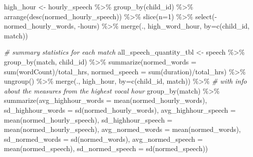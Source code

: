 \documentclass[
]{article}
\newenvironment{Shaded}{\begin{snugshade}}{\end{snugshade}}
\newcommand{\AttributeTok}[1]{\textcolor[rgb]{0.77,0.63,0.00}{#1}}
\newcommand{\CommentTok}[1]{\textcolor[rgb]{0.56,0.35,0.01}{\textit{#1}}}
\newcommand{\DecValTok}[1]{\textcolor[rgb]{0.00,0.00,0.81}{#1}}
\newcommand{\FunctionTok}[1]{\textcolor[rgb]{0.00,0.00,0.00}{#1}}
\newcommand{\NormalTok}[1]{#1}
\newcommand{\OtherTok}[1]{\textcolor[rgb]{0.56,0.35,0.01}{#1}}
\newcommand{\SpecialCharTok}[1]{\textcolor[rgb]{0.00,0.00,0.00}{#1}}
\newcommand{\StringTok}[1]{\textcolor[rgb]{0.31,0.60,0.02}{#1}}
\begin{document}
\begin{Shaded}
\begin{Highlighting}[]
\NormalTok{high\_hour }\OtherTok{\textless{}{-}}\NormalTok{ hourly\_speech }\SpecialCharTok{\%\textgreater{}\%}
  \FunctionTok{group\_by}\NormalTok{(child\_id) }\SpecialCharTok{\%\textgreater{}\%}
  \FunctionTok{arrange}\NormalTok{(}\FunctionTok{desc}\NormalTok{(normed\_hourly\_speech)) }\SpecialCharTok{\%\textgreater{}\%}
  \FunctionTok{slice}\NormalTok{(}\AttributeTok{n=}\DecValTok{1}\NormalTok{) }\SpecialCharTok{\%\textgreater{}\%}
  \FunctionTok{select}\NormalTok{(}\SpecialCharTok{{-}}\NormalTok{normed\_hourly\_words, }\SpecialCharTok{{-}}\NormalTok{hours) }\SpecialCharTok{\%\textgreater{}\%}
  \FunctionTok{merge}\NormalTok{(., high\_word\_hour, }\AttributeTok{by=}\FunctionTok{c}\NormalTok{(}\StringTok{\textquotesingle{}child\_id\textquotesingle{}}\NormalTok{, }\StringTok{\textquotesingle{}match\textquotesingle{}}\NormalTok{))}
  
\CommentTok{\# summary statistics for each match }
\NormalTok{all\_speech\_quantity\_tbl }\OtherTok{\textless{}{-}}\NormalTok{ speech }\SpecialCharTok{\%\textgreater{}\%}
  \FunctionTok{group\_by}\NormalTok{(match, child\_id) }\SpecialCharTok{\%\textgreater{}\%}
  \FunctionTok{summarize}\NormalTok{(}\AttributeTok{normed\_words =} \FunctionTok{sum}\NormalTok{(wordCount)}\SpecialCharTok{/}\NormalTok{total\_hrs,}
            \AttributeTok{normed\_speech =} \FunctionTok{sum}\NormalTok{(duration)}\SpecialCharTok{/}\NormalTok{total\_hrs) }\SpecialCharTok{\%\textgreater{}\%}
  \FunctionTok{ungroup}\NormalTok{() }\SpecialCharTok{\%\textgreater{}\%}
  \FunctionTok{merge}\NormalTok{(., high\_hour, }\AttributeTok{by=}\FunctionTok{c}\NormalTok{(}\StringTok{\textquotesingle{}child\_id\textquotesingle{}}\NormalTok{, }\StringTok{\textquotesingle{}match\textquotesingle{}}\NormalTok{)) }\SpecialCharTok{\%\textgreater{}\%} \CommentTok{\# with info about the measures from the highest vocal hour}
  \FunctionTok{group\_by}\NormalTok{(match) }\SpecialCharTok{\%\textgreater{}\%}
  \FunctionTok{summarize}\NormalTok{(}\AttributeTok{avg\_highhour\_words =} \FunctionTok{mean}\NormalTok{(normed\_hourly\_words),}
            \AttributeTok{sd\_highhour\_words =} \FunctionTok{sd}\NormalTok{(normed\_hourly\_words),}
            \AttributeTok{avg\_highhour\_speech =} \FunctionTok{mean}\NormalTok{(normed\_hourly\_speech),}
            \AttributeTok{sd\_highhour\_speech =} \FunctionTok{mean}\NormalTok{(normed\_hourly\_speech),}
            \AttributeTok{avg\_normed\_words =} \FunctionTok{mean}\NormalTok{(normed\_words),}
            \AttributeTok{sd\_normed\_words =} \FunctionTok{sd}\NormalTok{(normed\_words),}
            \AttributeTok{avg\_normed\_speech =} \FunctionTok{mean}\NormalTok{(normed\_speech),}
            \AttributeTok{sd\_normed\_speech =} \FunctionTok{sd}\NormalTok{(normed\_speech))}


\end{Highlighting}
\end{Shaded}
\end{document}
